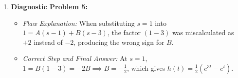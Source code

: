\documentclass[11pt, letterpaper]{article}
\theoremstyle{definition}
\theoremstyle{remark}
\begin{document}
\begin{enumerate}
    \item \textbf{Diagnostic Problem 5:}
    \begin{itemize}
        \item \emph{Flaw Explanation:} When substituting $s = 1$ into $1 = A(s - 1) + B(s - 3)$, the factor $(1 - 3)$ was miscalculated as $+2$ instead of $-2$, producing the wrong sign for $B$.
        \item \emph{Correct Step and Final Answer:} At $s = 1$, $1 = B(1 - 3) = -2B \implies B = -\frac{1}{2}$, which gives $h(t) = \frac{1}{2}\left(e^{3t} - e^{t}\right)$.
    \end{itemize}
\end{enumerate}
\end{document}
